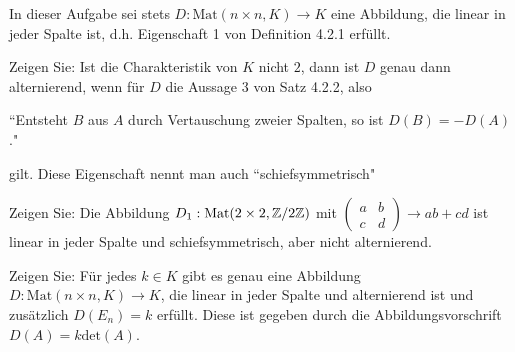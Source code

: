 \begin{Problem}
	In dieser Aufgabe sei stets $D:\text{Mat}(n\times n,K)\to K$ eine Abbildung, die linear in jeder Spalte ist, d.h. Eigenschaft 1 von Definition 4.2.1 erfüllt.
	\begin{parts}
	\item Zeigen Sie: Ist die Charakteristik von $K$ nicht $2$, dann ist $D$ genau dann alternierend, wenn f\"{u}r $D$ die Aussage $3$ von Satz 4.2.2, also
\begin{center}
	``Entsteht $B$ aus $A$ durch Vertauschung zweier Spalten, so ist $D(B)=-D(A)$."
\end{center}
gilt. Diese Eigenschaft nennt man auch ``schiefsymmetrisch"
\item Zeigen Sie: Die Abbildung $D_1:\text{Mat}(2\times 2, \mathbb{Z} / 2\mathbb{Z})$ mit $\begin{pmatrix} a & b \\ c & d \end{pmatrix} \to ab+cd$ ist linear in jeder Spalte und schiefsymmetrisch, aber nicht alternierend. 
\item Zeigen Sie: F\"{u}r jedes $k\in K$ gibt es genau eine Abbildung $D:\text{Mat}(n\times n,K)\to K$, die linear in jeder Spalte und alternierend ist und zusätzlich $D(E_n)=k$ erfüllt. Diese ist gegeben durch die Abbildungsvorschrift $D(A)=k\text{det}(A)$.
	\end{parts}
\end{Problem}
